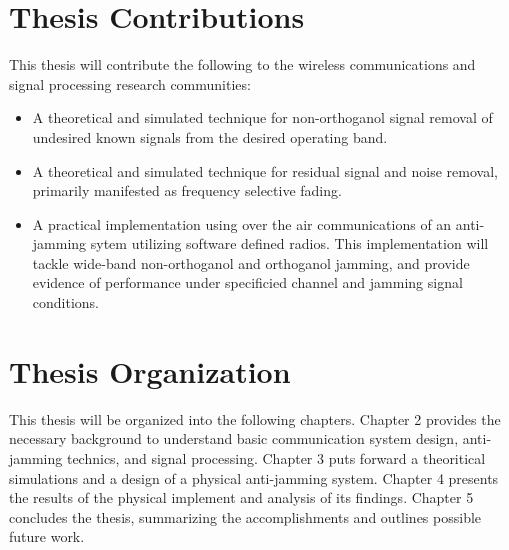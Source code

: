 \section{Thesis Contributions}

This thesis will contribute the following to the wireless communications and signal processing research communities:

\begin{itemize}
\item A theoretical and simulated technique for non-orthoganol signal removal of undesired known signals from the desired operating band.

\item A theoretical and simulated technique for residual signal and noise removal, primarily manifested as frequency selective fading.

\item A practical implementation using over the air communications of an anti-jamming sytem utilizing software defined radios. This implementation will tackle wide-band non-orthoganol and orthoganol jamming, and provide evidence of performance under specificied channel and jamming signal conditions.

\end{itemize}


\section{Thesis Organization}

This thesis will be organized into the following chapters.  Chapter 2 provides the necessary background to understand basic communication system design, anti-jamming technics, and signal processing.  Chapter 3 puts forward a theoritical simulations and a design of a physical anti-jamming system.  Chapter 4 presents the results of the physical implement and analysis of its findings.  Chapter 5 concludes the thesis, summarizing the accomplishments and outlines possible future work.
